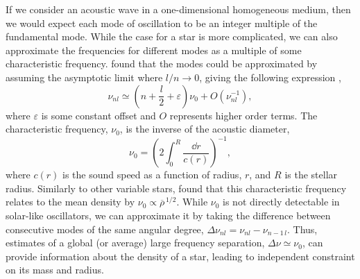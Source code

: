 If we consider an acoustic wave in a one-dimensional homogeneous medium, then we would expect each mode of oscillation to be an integer multiple of the fundamental mode. While the case for a star is more complicated, we can also approximate the frequencies for different modes as a multiple of some characteristic frequency. \citet{Tassoul1980} found that the modes could be approximated by assuming the asymptotic limit where \(l/n \rightarrow 0\), giving the following expression \citep[cf.][]{Gough1986},
%
\begin{equation}
    \nu_{nl} \simeq \left(n + \frac{l}{2} + \varepsilon\right) \nu_0 + O(\nu_{nl}^{-1}), \label{eq:asy}
\end{equation}
%
where \(\varepsilon\) is some constant offset and \(O\) represents higher order terms. The characteristic frequency, \(\nu_0\), is the inverse of the acoustic diameter,
%
\begin{equation}
    \nu_0 = \left(2 \int_{0}^{R} \frac{\dd r}{c(r)}\right)^{-1},
\end{equation}
%
where \(c(r)\) is the sound speed as a function of radius, \(r\), and \(R\) is the stellar radius. Similarly to other variable stars, \citet{Ulrich1986} found that this characteristic frequency relates to the mean density by \(\nu_0 \propto \overline{\rho}^{\,1/2}\). While \(\nu_0\) is not directly detectable in solar-like oscillators, we can approximate it by taking the difference between consecutive modes of the same angular degree, \(\Delta\nu_{nl} = \nu_{nl} - \nu_{n-1\,l}\). Thus, estimates of a global (or average) large frequency separation, \(\Delta\nu \simeq \nu_0\), can provide information about the density of a star, leading to independent constraint on its mass and radius.


